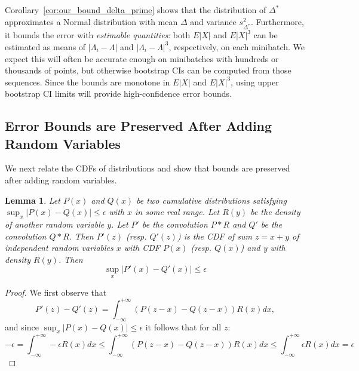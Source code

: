 \documentclass{article}
\newtheorem{lemma}{Lemma}
\begin{document}
Corollary~\ref{cor:our_bound_delta_prime} shows that the distribution of
$\Delta^*$ approximates a Normal distribution with mean $\Delta$ and variance
$s^2_{\Delta^*}$. Furthermore, it bounds the error with \emph{estimable
quantities}: both $E|X|$ and $E|X|^3$ can be estimated as means of $|\Lambda_i
- \Lambda|$ and $|\Lambda_i - \Lambda|^3$, respectively, on each minibatch. We
expect this will often be accurate enough on minibatches with hundreds or
thousands of points, but otherwise bootstrap CIs can be computed from those
sequences. Since the bounds are monotone in $E|X|$ and $E|X|^3$, using upper
bootstrap CI limits will provide high-confidence error bounds.



\subsection{Error Bounds are Preserved After Adding Random Variables}\label{ssec:preserve_bounds}

We next relate the CDFs of distributions and show that bounds are preserved
after adding random variables.

\begin{lemma}\label{lem:cdf_bounds}
Let $P(x)$ and $Q(x)$ be two cumulative distributions satisfying
$\sup_x|P(x)-Q(x)|\leq \epsilon$ with $x$ in some real range. Let $R(y)$ be the
{\em density} of another random variable $y$. Let $P'$ be the convolution $P*R$
and $Q'$ be the convolution $Q*R$. Then $P'(z)$ (resp. $Q'(z)$) is the CDF of
sum $z=x+y$ of independent random variables $x$ with CDF $P(x)$ (resp. $Q(x)$)
and y with density $R(y)$.  Then
\begin{equation}
    \sup_x|P'(x)-Q'(x)|\leq \epsilon
\end{equation}
\end{lemma}

\begin{proof}
We first observe that
\begin{equation}\label{eq:pdf_difference}
    P'(z) - Q'(z) = \int_{-\infty}^{+\infty}(P(z-x)-Q(z-x))R(x) dx,
\end{equation}
and since $\sup_x|P(x)-Q(x)|\leq \epsilon$ it follows that for all $z$:
\begin{equation}
-\epsilon = \int_{-\infty}^{+\infty} -\epsilon R(x) dx \leq \int_{-\infty}^{+\infty}(P(z-x)-Q(z-x))R(x) dx \leq \int_{-\infty}^{+\infty}\epsilon R(x) dx = \epsilon
\end{equation}
\end{proof}
\end{document}
